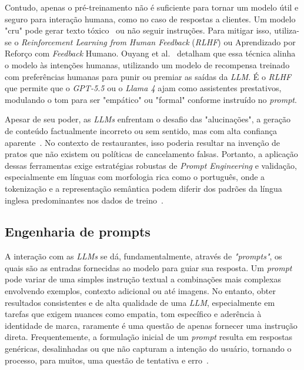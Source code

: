 \documentclass[12pt, a4paper]{article}
\numberwithin{equation}{section}
\begin{document}
Contudo, apenas o pré-treinamento não é suficiente para tornar um modelo útil e seguro para interação humana, como no caso de respostas a clientes. Um modelo "cru" pode gerar texto tóxico~\cite{gehman2020, weidinger2021} ou não seguir instruções. Para mitigar isso, utiliza-se o \textit{Reinforcement Learning from Human Feedback} (\textit{RLHF}) ou Aprendizado por Reforço com \textit{Feedback} Humano. Ouyang et al.~\cite{ouyang2022training} detalham que essa técnica alinha o modelo às intenções humanas, utilizando um modelo de recompensa treinado com preferências humanas para punir ou premiar as saídas da \textit{LLM}. É o \textit{RLHF} que permite que o \textit{GPT-5.5} ou o \textit{Llama 4} ajam como assistentes prestativos, modulando o tom para ser "empático" ou "formal" conforme instruído no \textit{prompt}.

Apesar de seu poder, as \textit{LLMs} enfrentam o desafio das "alucinações", a geração de conteúdo factualmente incorreto ou sem sentido, mas com alta confiança aparente~\cite{ji2023survey}. No contexto de restaurantes, isso poderia resultar na invenção de pratos que não existem ou políticas de cancelamento falsas. Portanto, a aplicação dessas ferramentas exige estratégias robustas de \textit{Prompt Engineering} e validação, especialmente em línguas com morfologia rica como o português, onde a tokenização e a representação semântica podem diferir dos padrões da língua inglesa predominantes nos dados de treino~\cite{araujo2024Explorando}.

\subsection{Engenharia de prompts}

A interação com as \textit{LLMs} se dá, fundamentalmente, através de \textit{"prompts"}, os quais são as entradas fornecidas ao modelo para guiar sua resposta. Um \textit{prompt} pode variar de uma simples instrução textual a combinações mais complexas envolvendo exemplos, contexto adicional ou até imagens. No entanto, obter resultados consistentes e de alta qualidade de uma \textit{LLM}, especialmente em tarefas que exigem nuances como empatia, tom específico e aderência à identidade de marca, raramente é uma questão de apenas fornecer uma instrução direta. Frequentemente, a formulação inicial de um \textit{prompt} resulta em respostas genéricas, desalinhadas ou que não capturam a intenção do usuário, tornando o processo, para muitos, uma questão de tentativa e erro~\cite{dang2022How}.
\end{document}

